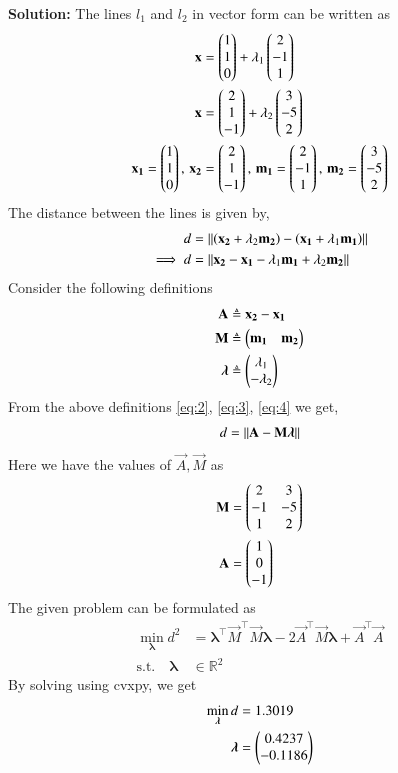 \documentclass[journal,12pt,twocolumn]{IEEEtran}
\begin{document}
\begin{enumerate}
\textbf{Solution:} The lines $l_1$ and $l_2$ in vector form can be written as
\begin{align}
\mathbf{x} &= \begin{pmatrix}1\\1\\0\end{pmatrix} + \lambda_1\begin{pmatrix}2\\-1\\1\end{pmatrix}\\
\mathbf{x} &= \begin{pmatrix}2\\1\\-1\end{pmatrix} + \lambda_2\begin{pmatrix}3\\-5\\2\end{pmatrix}\\
\mathbf{x_1} = \begin{pmatrix}1\\1\\0\end{pmatrix},\, \mathbf{x_2} &= \begin{pmatrix}2\\1\\-1\end{pmatrix}, \,\mathbf{m_1} = \begin{pmatrix}2\\-1\\1\end{pmatrix}, \, \mathbf{m_2} = \begin{pmatrix}3\\-5\\2\end{pmatrix}
\end{align}
The distance between the lines is given by,
\begin{align}
d &= \left\lVert\left(\mathbf{x_2}+ \lambda_2\mathbf{m_2}\right) - \left(\mathbf{x_1}+ \lambda_1\mathbf{m_1}\right)\right\rVert\\
\implies d &= \left\lVert\mathbf{x_2}-\mathbf{x_1}-\lambda_1\mathbf{m_1}+\lambda_2\mathbf{m_2}\right\rVert \label{eq:1}
\end{align}
Consider the following definitions
\begin{align}
\mathbf{A} &\triangleq \mathbf{x_2} - \mathbf{x_1} \label{eq:2}\\
\mathbf{M} &\triangleq \begin{pmatrix}\mathbf{m_1} & \mathbf{m_2}\end{pmatrix} \label{eq:3}\\
\bm{\lambda} &\triangleq \begin{pmatrix}\lambda_1\\-\lambda_2\end{pmatrix} \label{eq:4}
\end{align}
From the above definitions \eqref{eq:2}, \eqref{eq:3}, \eqref{eq:4} we get,
\begin{align}
d = \left\lVert\mathbf{A}-\mathbf{M}\bm{\lambda}\right\rVert
\end{align}
Here we have the values of $\vec{A}, \vec{M}$ as
\begin{align}
\mathbf{M} &= \begin{pmatrix}2&3\\-1&-5\\1&2\end{pmatrix}\\
\mathbf{A} &= \begin{pmatrix}1\\0\\-1\end{pmatrix}
\end{align}
The given problem can be formulated as 
\begin{align}
\min_{\bm{\lambda}} d^2 &= \bm{\lambda}^{\top}\vec{M}^\top\vec{M}\bm{\lambda} - 2\vec{A}^\top\vec{M}\bm{\lambda}+\vec{A}^\top\vec{A}\\
\text{s.t.} \quad \bm{\lambda} &\in \mathbb{R}^2 
\end{align}
By solving using cvxpy, we get
\begin{align}
\min_{\bm{\lambda}} d &= 1.3019 \\
\bm{\lambda} &= \begin{pmatrix}0.4237 \\-0.1186\end{pmatrix} 
\end{align}


\end{enumerate}
\end{document}
